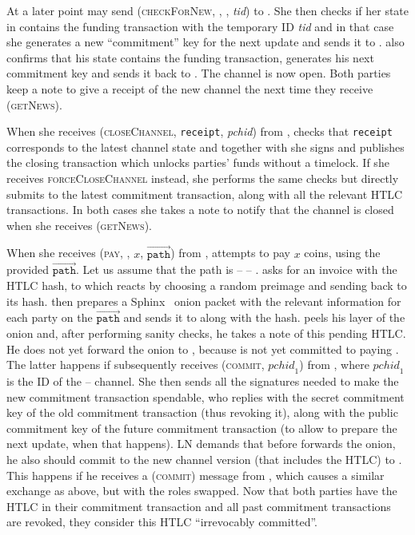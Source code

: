     At a later point \environment{} may send (\textsc{checkForNew}, \alice,
    \bob, \textit{tid}) to \alice. She then checks if her state in \ledger{}
    contains the funding transaction with the temporary ID \textit{tid} and in
    that case she generates a new ``commitment'' key for the next update and
    sends it to \bob. \bob{} also confirms that his state contains the funding
    transaction, generates his next commitment key and sends it back to \alice.
    The channel is now open. Both parties keep a note to give \environment{}
    a receipt of the new channel the next time they receive (\textsc{getNews}).

    When she receives (\textsc{closeChannel}, \texttt{receipt}, \textit{pchid})
    from \environment, \alice{} checks that \texttt{receipt} corresponds to the
    latest channel state and together with \bob{} she signs and publishes the
    closing transaction which unlocks parties' funds without a timelock. If she
    receives \textsc{forceCloseChannel} instead, she performs the same checks
    but directly submits to \ledger{} the latest commitment transaction, along
    with all the relevant HTLC transactions. In both cases she takes a note to
    notify \environment{} that the channel is closed when she receives
    (\textsc{getNews}).

    When she receives (\textsc{pay}, \charlie, $x$,
    $\overrightarrow{\mathtt{path}}$) from \environment, \alice{} attempts to
    pay \charlie{} $x$ coins, using the provided
    $\overrightarrow{\mathtt{path}}$. Let us assume that the path is \alice{} --
    \bob{} -- \charlie. \alice{} asks \charlie{} for an invoice with the HTLC
    hash, to which \charlie{} reacts by choosing a random preimage and sending
    back to \alice{} its hash. \alice{} then prepares a Sphinx~\cite{sphinx}
    onion packet with the relevant information for each party on the
    $\overrightarrow{\mathtt{path}}$ and sends it to \bob{} along with the hash.
    \bob{} peels his layer of the onion and, after performing sanity checks, he
    takes a note of this pending HTLC. He does not yet forward the onion to
    \charlie, because \alice{} is not yet committed to paying \bob. The latter
    happens if \alice{} subsequently receives (\textsc{commit},
    $\mathit{pchid}_1$) from \environment, where $\mathit{pchid}_1$ is the ID of
    the \alice{} -- \bob{} channel. She then sends \bob{} all the signatures
    needed to make the new commitment transaction spendable, who replies with
    the secret commitment key of the old commitment transaction (thus revoking
    it), along with the public commitment key of the future commitment
    transaction (to allow \alice{} to prepare the next update, when that
    happens). LN demands that before \bob{} forwards the onion, he also should
    commit to the new channel version (that includes the HTLC) to \alice. This
    happens if he receives a (\textsc{commit}) message from \environment, which
    causes a similar exchange as above, but with the roles swapped. Now that
    both parties have the HTLC in their commitment transaction and all past
    commitment transactions are revoked, they consider this HTLC ``irrevocably
    committed''.

